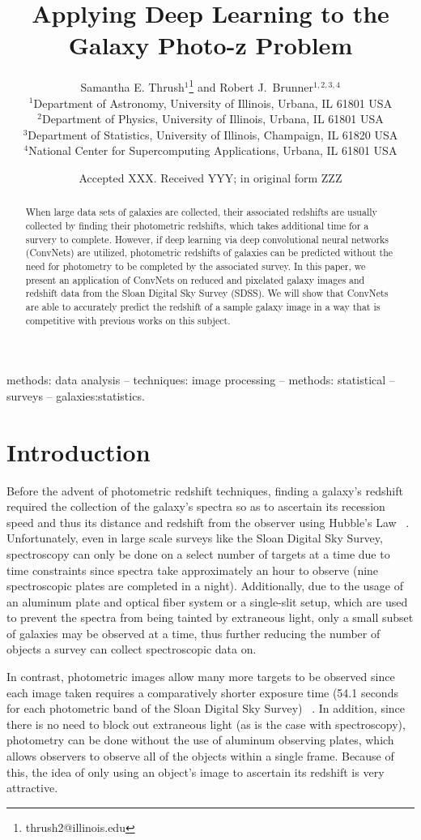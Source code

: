 \documentclass[fleqn,usenatbib]{mnras}
\title[Dreaming of Photo-z's]{Applying Deep Learning to the Galaxy Photo-z Problem}
\author[S. E. Thrush and R. J. Brunner]{
  Samantha E. Thrush$^1$\thanks{thrush2@illinois.edu} and Robert J.~Brunner$^{1,2,3,4}$ \\
$^1$Department of Astronomy, University of Illinois, Urbana, IL 61801 USA\\
$^2$Department of Physics, University of Illinois, Urbana, IL 61801 USA\\
$^3$Department of Statistics, University of Illinois, Champaign, IL 61820 USA\\
$^4$National Center for Supercomputing Applications, Urbana, IL 61801 USA
}
\date{Accepted XXX. Received YYY; in original form ZZZ}
\begin{document}
\label{firstpage}
\pagerange{\pageref{firstpage}--\pageref{lastpage}}
\maketitle

\begin{abstract}
When large data sets of galaxies are collected, their associated redshifts are usually collected by finding their photometric redshifts, which takes additional time for a survery to complete.  However, if deep learning via deep convolutional neural networks (ConvNets) are utilized, photometric redshifts of galaxies can be predicted without the need for photometry to be completed by the associated survey. In this paper, we present an application of ConvNets on reduced and pixelated galaxy images and redshift data from the Sloan Digital Sky Survey (SDSS).  We will show that ConvNets are able to accurately predict the redshift of a sample galaxy image in a way that is competitive with previous works on this subject.
\end{abstract}

\begin{keywords}
methods: data analysis -- techniques: image processing -- methods: statistical
-- surveys -- galaxies:statistics.
\end{keywords}

\section{Introduction}
  \label{sec:introduction}
Before the advent of photometric redshift techniques, finding a galaxy's redshift required the collection of the galaxy's spectra so as to ascertain its recession speed and thus its distance and redshift from the observer using Hubble's Law ~\citep{hubble_relation_1929}. Unfortunately, even in large scale surveys like the Sloan Digital Sky Survey, spectroscopy can only be done on a select number of targets at a time due to time constraints since spectra take approximately an hour to observe (nine spectroscopic plates are completed in a night).  Additionally, due to the usage of an aluminum plate and optical fiber system or a single-slit setup, which are used to prevent the spectra from being tainted by extraneous light, only a small subset of galaxies may be observed at a time, thus further reducing the number of objects a survey can collect spectroscopic data on.

In contrast, photometric images allow many more targets to be observed since each image taken requires a comparatively shorter exposure time (54.1 seconds for each photometric band of the Sloan Digital Sky Survey) ~\citep{york_sloan_2000}.  In addition, since there is no need to block out extraneous light (as is the case with spectroscopy), photometry can be done without the use of aluminum observing plates, which allows observers to observe all of the objects within a single frame.  Because of this, the idea of only using an object's image to ascertain its redshift is very attractive.
\end{document}
